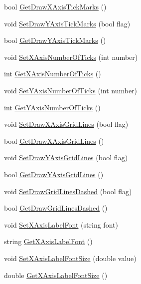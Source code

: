 \begin{DoxyCompactItemize}
\item 
bool \hyperlink{class_c_plot2_d_a3e28eae3694cedf91678747937e4e395}{Get\-Draw\-X\-Axis\-Tick\-Marks} ()
\item 
void \hyperlink{class_c_plot2_d_a8e6b9bc812a1a4253a8f80f807df117c}{Set\-Draw\-Y\-Axis\-Tick\-Marks} (bool flag)
\item 
bool \hyperlink{class_c_plot2_d_a9316f51e4da7833c5e6daae7a28d6feb}{Get\-Draw\-Y\-Axis\-Tick\-Marks} ()
\item 
void \hyperlink{class_c_plot2_d_ad7200fa68ce1bdd90803f5a713cb7fa3}{Set\-X\-Axis\-Number\-Of\-Ticks} (int number)
\item 
int \hyperlink{class_c_plot2_d_ae45513993b249321e94328958843615b}{Get\-X\-Axis\-Number\-Of\-Ticks} ()
\item 
void \hyperlink{class_c_plot2_d_a95fbc26569a85b32b44382b98efd8462}{Set\-Y\-Axis\-Number\-Of\-Ticks} (int number)
\item 
int \hyperlink{class_c_plot2_d_a2257fa9c8396d1dd706254c277b591e9}{Get\-Y\-Axis\-Number\-Of\-Ticks} ()
\item 
void \hyperlink{class_c_plot2_d_a2dd8afc980ef7e53926dba9d609548d8}{Set\-Draw\-X\-Axis\-Grid\-Lines} (bool flag)
\item 
bool \hyperlink{class_c_plot2_d_a235ddbe071136d11e2e2a30d9ebe32f5}{Get\-Draw\-X\-Axis\-Grid\-Lines} ()
\item 
void \hyperlink{class_c_plot2_d_a656c11eeb9438cefce1a6ab27ee33e4b}{Set\-Draw\-Y\-Axis\-Grid\-Lines} (bool flag)
\item 
bool \hyperlink{class_c_plot2_d_aace7d6879ba98924284f02075df2fc4f}{Get\-Draw\-Y\-Axis\-Grid\-Lines} ()
\item 
void \hyperlink{class_c_plot2_d_ab22b71c62777124839f4bbf001030ad0}{Set\-Draw\-Grid\-Lines\-Dashed} (bool flag)
\item 
bool \hyperlink{class_c_plot2_d_ae73a39d3021352ba41626e091e89c040}{Get\-Draw\-Grid\-Lines\-Dashed} ()
\item 
void \hyperlink{class_c_plot2_d_acddafda17b003f9e4dbb57cf0031fde2}{Set\-X\-Axis\-Label\-Font} (string font)
\item 
string \hyperlink{class_c_plot2_d_afea9d57e34de2a8a6305fe887a21b413}{Get\-X\-Axis\-Label\-Font} ()
\item 
void \hyperlink{class_c_plot2_d_a8aac74c7d0067c9826aa18f840e1f639}{Set\-X\-Axis\-Label\-Font\-Size} (double value)
\item 
double \hyperlink{class_c_plot2_d_a8c5120a371d3a974c5d775bb9a271932}{Get\-X\-Axis\-Label\-Font\-Size} ()

\end{DoxyCompactItemize}
